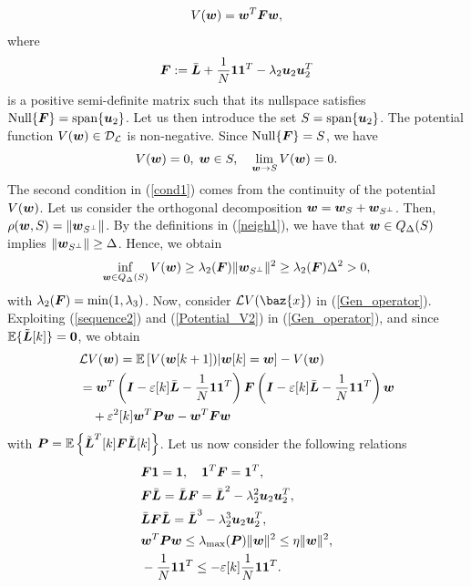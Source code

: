 \documentclass[10pt,twocolumn]{IEEEtran}
\def\bF{\mbox{\boldmath $F$}}
\def\bI{\mbox{\boldmath $I$}}
\def\bL{\mbox{\boldmath $L$}}
\def\bP{\mbox{\boldmath $P$}}
\def\bu{\mbox{\boldmath $u$}}
\def\bw{\mbox{\boldmath $w$}}
\def\bx{\baz{x}}
\begin{document}
\begin{align}\label{Potential_V2}
  V(\bw)=\bw^T\bF\bw,
\end{align}
where
\begin{align}\label{Matrix_F}
\bF:=\bar{\bL}+\frac{1}{N}\mathbf{11}^T-\lambda_2\bu_2\bu^T_2
\end{align}
is a positive semi-definite matrix such that its nullspace satisfies ${\rm Null}\{\bF\}={\rm span}\{\bu_2\}$. Let us then introduce the set $S={\rm span}\{\bu_2\}$. The potential function $V(\bw)\in\mathcal{D}_{\mathcal{L}}$ is non-negative. Since ${\rm Null}\{\bF\}=S$, we have
\begin{align}\label{cond1}
  V(\bw)=0, \; \bw\in S, \quad \lim_{\boldsymbol{w}\rightarrow S} V(\bw)=0.
\end{align}
The second condition in (\ref{cond1}) comes from the continuity of the potential $V(\bw)$. Let us consider the orthogonal decomposition $\bw=\bw_{S}+\bw_{S^\perp}$. Then, $\rho(\bw,S)=\|\bw_{S^\perp}\|$. By the definitions in (\ref{neigh1}), we have that $\bw\in Q_\Delta(S)$ implies $\|\bw_{S^\perp}\|\geq \Delta$. Hence, we obtain
\begin{align}
 \inf_{\boldsymbol{w}\in Q_\Delta(S)} V(\bw)\geq \lambda_2(\bF)\|\bw_{S^\perp}\|^2\geq \lambda_2(\bF)\Delta^2>0, \nonumber
\end{align}
with $\lambda_2(\bF)=\min(1,\lambda_3)$. Now, consider $\mathcal{L}V(\bx)$ in (\ref{Gen_operator}). Exploiting (\ref{sequence2}) and (\ref{Potential_V2}) in (\ref{Gen_operator}), and since $\mathbb{E}\{\tilde{\bL}[k]\}=\mathbf{0}$, we obtain
\begin{align}\label{Gen_operator2}
&\mathcal{L}V(\bw)=\mathbb{E}\left[ V(\bw[k+1]) | \bw[k]=\bw \right]-V(\bw) \nonumber\\
&=\bw^T\left(\bI-\varepsilon[k]\bar{\bL}-\frac{1}{N}\mathbf{11}^T\right)\bF\left(\bI-\varepsilon[k]\bar{\bL}-\frac{1}{N}\mathbf{11}^T\right)\bw \nonumber\\
& \quad+ \varepsilon^2[k]\bw^T\bP\bw -\bw^T\bF\bw
\end{align}
with $\bP=\mathbb{E}\left\{ \tilde{\bL}^T[k]\bF\tilde{\bL}[k] \right\}$. Let us now consider the following relations
\begin{align}
&\bF\mathbf{1}=\mathbf{1}, \quad \mathbf{1}^T\bF=\mathbf{1}^T, \label{eq_1}\\
&\bF\bar{\bL}=\bar{\bL}\bF=\bar{\bL}^2-\lambda^2_2\bu_2\bu_2^T, \\
&\bar{\bL}\bF\bar{\bL}=\bar{\bL}^3-\lambda^3_2\bu_2\bu_2^T, \\
&\bw^T\bP\bw\leq\lambda_{\max}(\bP)\|\bw\|^2\leq\eta\|\bw\|^2, \label{ineq_4}\\
&-\frac{1}{N}\mathbf{11}^T\leq -\varepsilon[k]\frac{1}{N}\mathbf{11}^T. \label{ineq_5}
\end{align}
\end{document}
